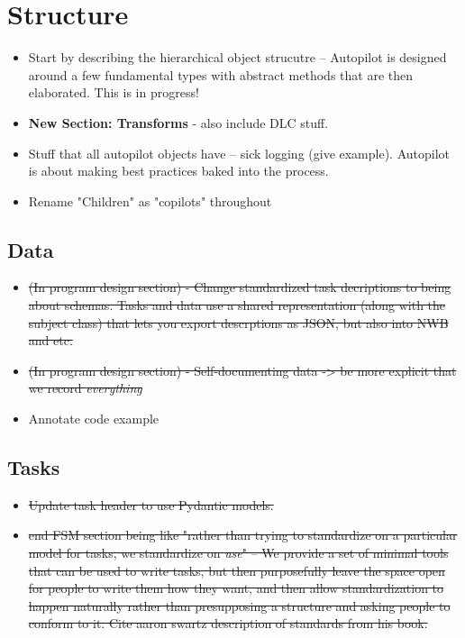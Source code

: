 \section{Structure}

\begin{itemize}
\item Start by describing the hierarchical object strucutre -- Autopilot is designed around a few fundamental types with abstract methods that are then elaborated. This is in progress!
\item \textbf{New Section: Transforms} - also include DLC stuff.
\item Stuff that all autopilot objects have -- sick logging (give example). Autopilot is about making best practices baked into the process. 
\item Rename "Children" as "copilots" throughout
\end{itemize}

\subsection{Data}

\begin{itemize}
\item \sout{(In program design section) - Change standardized task decriptions to being about schemas. Tasks and data use a shared representation (along with the subject class) that lets you export descrptions as JSON, but also into NWB and etc.}
\item \sout{(In program design section) - Self-documenting data -> be more explicit that we record \textit{everything}}
\item Annotate code example
\end{itemize}

\subsection{Tasks}

\begin{itemize}
\item \sout{Update task header to use Pydantic models.}
\item \sout{end FSM section being like "rather than trying to standardize on a particular model for tasks, we standardize on \textit{use}" -- We provide a set of minimal tools that can be used to write tasks, but then purposefully leave the space open for people to write them how they want, and then allow standardization to happen naturally rather than presupposing a structure and asking people to conform to it. Cite aaron swartz description of standards from his book.}
\end{itemize}

